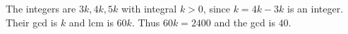 The integers are $3k,4k,5k$ with integral $k>0$, since $k=4k-3k$ is an integer. Their gcd is $k$ and lcm is $60k$. Thus $60k=2400$ and the gcd is $\boxed{40}$.
